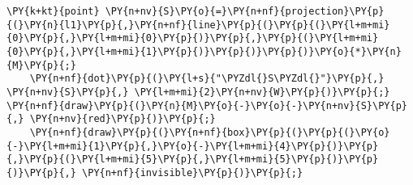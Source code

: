 \begin{Verbatim}[commandchars=\\\{\}]
    \PY{k+kt}{point} \PY{n+nv}{S}\PY{o}{=}\PY{n+nf}{projection}\PY{p}{(}\PY{n}{l1}\PY{p}{,}\PY{n+nf}{line}\PY{p}{(}\PY{p}{(}\PY{l+m+mi}{0}\PY{p}{,}\PY{l+m+mi}{0}\PY{p}{)}\PY{p}{,}\PY{p}{(}\PY{l+m+mi}{0}\PY{p}{,}\PY{l+m+mi}{1}\PY{p}{)}\PY{p}{)}\PY{p}{)}\PY{o}{*}\PY{n}{M}\PY{p}{;}
    \PY{n+nf}{dot}\PY{p}{(}\PY{l+s}{"\PYZdl{}S\PYZdl{}"}\PY{p}{,} \PY{n+nv}{S}\PY{p}{,} \PY{l+m+mi}{2}\PY{n+nv}{W}\PY{p}{)}\PY{p}{;} \PY{n+nf}{draw}\PY{p}{(}\PY{n}{M}\PY{o}{-}\PY{o}{-}\PY{n+nv}{S}\PY{p}{,} \PY{n+nv}{red}\PY{p}{)}\PY{p}{;}
    \PY{n+nf}{draw}\PY{p}{(}\PY{n+nf}{box}\PY{p}{(}\PY{p}{(}\PY{o}{-}\PY{l+m+mi}{1}\PY{p}{,}\PY{o}{-}\PY{l+m+mi}{4}\PY{p}{)}\PY{p}{,}\PY{p}{(}\PY{l+m+mi}{5}\PY{p}{,}\PY{l+m+mi}{5}\PY{p}{)}\PY{p}{)}\PY{p}{,} \PY{n+nf}{invisible}\PY{p}{)}\PY{p}{;}
\end{Verbatim}
